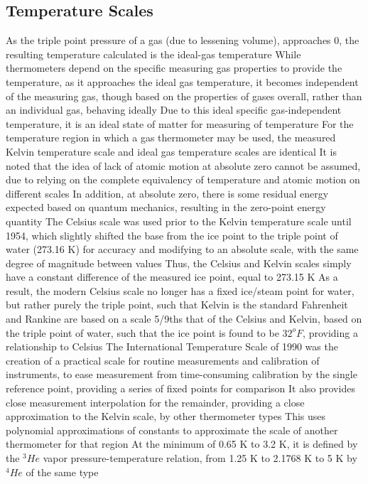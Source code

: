 \documentclass[11 pt, twoside]{article}
\newenvironment{outline*}
{
	\begin{outline}[enumerate]
	}
	{\end{outline}
}
\begin{document}
\subsection{Temperature Scales}
\begin{outline*}
\1 As the triple point pressure of a gas (due to lessening volume), approaches 0, the resulting temperature calculated is the ideal-gas temperature
\2 While thermometers depend on the specific measuring gas properties to provide the temperature, as it approaches the ideal gas temperature, it becomes independent of the measuring gas, though based on the properties of gases overall, rather than an individual gas, behaving ideally
\3 Due to this ideal specific gas-independent temperature, it is an ideal state of matter for measuring of temperature
\2 For the temperature region in which a gas thermometer may be used, the measured Kelvin temperature scale and ideal gas temperature scales are identical
\2 It is noted that the idea of lack of atomic motion at absolute zero cannot be assumed, due to relying on the complete equivalency of temperature and atomic motion on different scales 
\3 In addition, at absolute zero, there is some residual energy expected based on quantum mechanics, resulting in the zero-point energy quantity
\1 The Celsius scale was used prior to the Kelvin temperature scale until 1954, which slightly shifted the base from the ice point to the triple point of water (273.16 K) for accuracy and modifying to an absolute scale, with the same degree of magnitude between values
\2 Thus, the Celsius and Kelvin scales simply have a constant difference of the measured ice point, equal to 273.15 K
\2 As a result, the modern Celsius scale no longer has a fixed ice/steam point for water, but rather purely the triple point, such that Kelvin is the standard
\1 Fahrenheit and Rankine are based on a scale 5/9ths that of the Celsius and Kelvin, based on the triple point of water, such that the ice point is found to be $32^o F$, providing a relationship to Celsius
\1 The International Temperature Scale of 1990 was the creation of a practical scale for routine measurements and calibration of instruments, to ease measurement from time-consuming calibration by the single reference point,  providing a series of fixed points for comparison
\2 It also provides close measurement interpolation for the remainder, providing a close approximation to the Kelvin scale, by other thermometer types
\3 This uses polynomial approximations of constants to approximate the scale of another thermometer for that region
\2 At the minimum of 0.65 K to 3.2 K, it is defined by the $^3He$ vapor pressure-temperature relation, from 1.25 K to 2.1768 K to 5 K by $^4He$ of the same type

\end{outline*}
\end{document}
